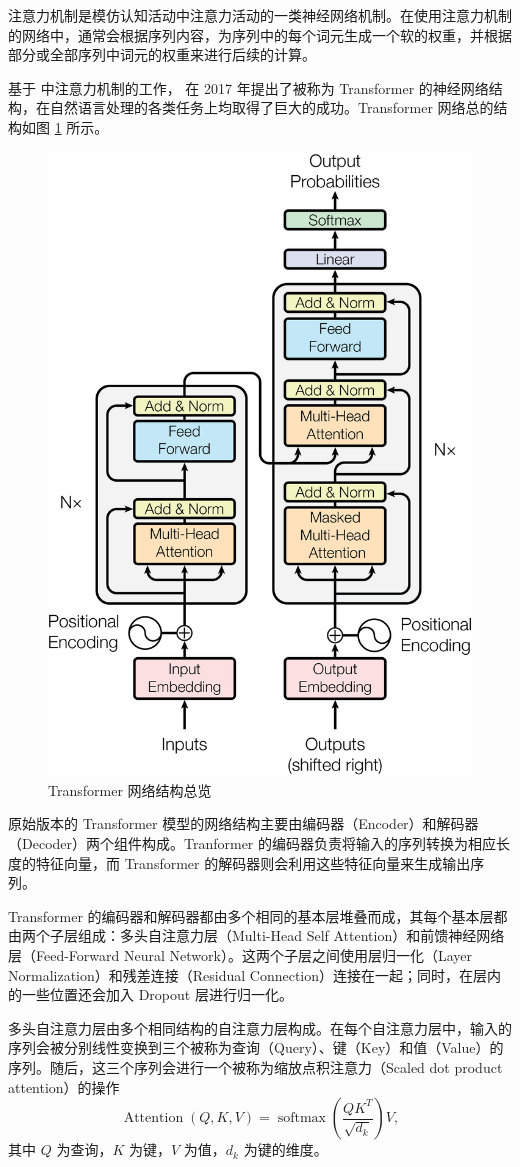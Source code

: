 注意力机制是模仿认知活动中注意力活动的一类神经网络机制。在使用注意力机制的网络中，通常会根据序列内容，为序列中的每个词元生成一个软的权重，并根据部分或全部序列中词元的权重来进行后续的计算。

基于 \citet{bahdanau2016neural} 中注意力机制的工作，\citet{Vaswani2017AttentionIA} 在 2017 年提出了被称为 Transformer 的神经网络结构，在自然语言处理的各类任务上均取得了巨大的成功。Transformer 网络总的结构如图 \ref{fig:transformer_overview} 所示。

\begin{figure}[h]
  \centering
  \includegraphics[width=0.5\linewidth]{figures/Transformer-Arch.png}
  \caption{Transformer 网络结构总览\cite{Vaswani2017AttentionIA}}
  \label{fig:transformer_overview}
\end{figure}


原始版本的 Transformer 模型的网络结构主要由编码器（Encoder）和解码器（Decoder）两个组件构成。Tranformer 的编码器负责将输入的序列转换为相应长度的特征向量，而 Transformer 的解码器则会利用这些特征向量来生成输出序列。

Transformer 的编码器和解码器都由多个相同的基本层堆叠而成，其每个基本层都由两个子层组成：多头自注意力层（Multi-Head Self Attention）和前馈神经网络层（Feed-Forward Neural Network）。这两个子层之间使用层归一化（Layer Normalization）和残差连接（Residual Connection）连接在一起；同时，在层内的一些位置还会加入 Dropout 层进行归一化。

多头自注意力层由多个相同结构的自注意力层构成。在每个自注意力层中，输入的序列会被分别线性变换到三个被称为查询（Query）、键（Key）和值（Value）的序列。随后，这三个序列会进行一个被称为缩放点积注意力（Scaled dot product attention）的操作
$$
\operatorname{Attention}(Q, K, V) = \operatorname{softmax}\left(\frac{Q K^T}{\sqrt{d_k}}\right)V,
$$
其中 $Q$ 为查询，$K$ 为键，$V$ 为值，$d_k$ 为键的维度。

